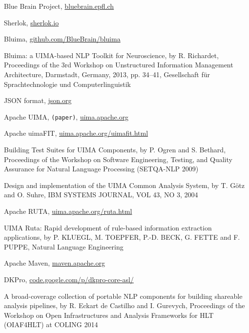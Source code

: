 \documentclass{article}
\newcommand{\TODO}[1]{\texttt{\textcolor{YellowOrange}{(#1)}}} %
\begin{document}
\begin{thebibliography}{99}

    Blue Brain Project,
    \href{http://bluebrain.epfl.ch/}{bluebrain.epfl.ch}

    Sherlok,
    \href{http://sherlok.io}{sherlok.io}

    Bluima,
    \href{https://github.com/BlueBrain/bluima}{github.com/BlueBrain/bluima}

    Bluima: a UIMA-based NLP Toolkit for Neuroscience,
    by R. Richardet,
    Proceedings of the 3rd Workshop on Unstructured Information Management Architecture, Darmstadt,
    Germany, 2013, pp. 34–41, Gesellschaft für Sprachtechnologie und Computerlinguistik

    JSON format,
    \href{http://json.org/}{json.org}

    Apache UIMA,
	\TODO{paper},
    \href{https://uima.apache.org/}{uima.apache.org}

    Apache uimaFIT,
    \href{https://uima.apache.org/uimafit.html}{uima.apache.org/uimafit.html}

    Building Test Suites for UIMA Components,
    by P. Ogren and S. Bethard,
    Proceedings of the Workshop on Software Engineering, Testing, and Quality Assurance for Natural
    Language Processing (SETQA-NLP 2009)

    Design and implementation of the UIMA Common Analysis System,
    by T. Götz and O. Suhre,
    IBM SYSTEMS JOURNAL, VOL 43, NO 3, 2004

    Apache RUTA,
    \href{https://uima.apache.org/ruta.html}{uima.apache.org/ruta.html}

    UIMA Ruta: Rapid development of rule-based information extraction applications,
    by P. KLUEGL, M. TOEPFER, P.-D. BECK, G. FETTE and F. PUPPE,
    Natural Language Engineering

    Apache Maven,
    \href{https://maven.apache.org/}{maven.apache.org}

    DKPro,
    \href{https://code.google.com/p/dkpro-core-asl/}{code.google.com/p/dkpro-core-asl/}

    A broad-coverage collection of portable NLP components for building shareable analysis
    pipelines,
    by R. Eckart de Castilho and I. Gurevych,
    Proceedings of the Workshop on Open Infrastructures and Analysis Frameworks for HLT (OIAF4HLT)
    at COLING 2014


\end{thebibliography}
\end{document}
